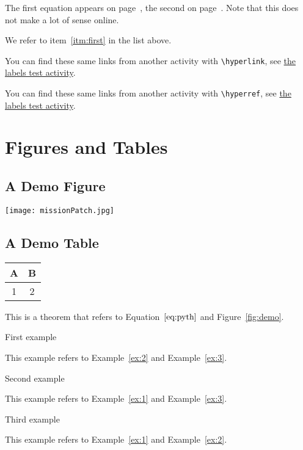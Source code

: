 \documentclass[landscape]{ximera}
\begin{document}
The first equation appears on page~\pageref{eq:pyth}, the second on page~\pageref{tag:pyth2}. 
Note that this does not make a lot of sense online.

We refer to item~\ref{itm:first} in the list above.

You can find these same links from another activity with \verb|\hyperlink|, see \hyperlink{xim:labelsFromOtherActivity}{the labels test activity}.

You can find these same links from another activity with \verb|\hyperref|, see \hyperref[xim:labelsFromOtherActivity]{the labels test activity}.

\section{Figures and Tables}

\subsection{A Demo Figure}
\label{sec:fig}

\begin{image}[0.3\textwidth]
  \centering
  \texttt{[image: missionPatch.jpg]} %
\end{image}
  \label{fig:demo}

\subsection{A Demo Table}

{
  \centering
  \begin{tabular}{|c|c|}
    \hline
    A & B \\
    \hline
    1 & 2 \\
    \hline
  \end{tabular}
  \label{tab:example}
}

 \begin{theorem} \label{thm:1}
  
  This is a theorem that refers to Equation~$\eqref{eq:pyth}$ and Figure~\ref{fig:demo}.

  
 \end{theorem}

\begin{example} \label{ex:1}
 First example  

 This example refers to Example~\ref{ex:2} and Example~\ref{ex:3}.

\end{example}
\begin{example} \label{ex:2}
 Second example  

  This example refers to Example~\ref{ex:1} and Example~\ref{ex:3}.
\end{example}
\begin{example} \label{ex:3}
 Third example  

  This example refers to Example~\ref{ex:1} and Example~\ref{ex:2}.
\end{example}
\end{document}

